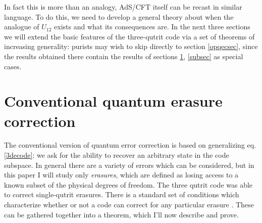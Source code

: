 \documentclass[12pt]{article}
\begin{document}
In fact this is more than an analogy, AdS/CFT itself can be recast in similar language.  To do this, we need to develop a general theory about when the analogue of $U_{12}$ exists and what its consequences are.  In the next three sections we will extend the basic features of the three-qutrit code via a set of theorems of increasing generality: purists may wish to skip directly to section \ref{opqecsec}, since the results obtained there contain the results of sections \ref{csec}, \ref{subsec} as special cases.

\section{Conventional quantum erasure correction}\label{csec}
The conventional version of quantum error correction is based on generalizing eq. \eqref{3decode}: we ask for the ability to recover an arbitrary state in the code subspace.  In general there are a variety of errors which can be considered, but in this paper I will study only \textit{erasures}, which are defined as losing access to a known subset of the physical degrees of freedom.  The three qutrit code was able to correct single-qutrit erasures.  There is a standard set of conditions which characterize whether or not a code can correct for any particular erasure \cite{Schumacher:1996dy,Grassl:1996eh}.  These can be gathered together into a theorem, which I'll now describe and prove.
\end{document}
